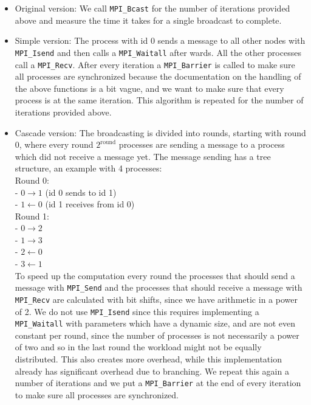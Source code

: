 \documentclass[11pt,a4paper,onecolumn]{article}
\begin{document}
\begin{itemize}
\item 
  Original version: We call \texttt{MPI\_Bcast} for the number of iterations provided above and measure the time it takes for a single broadcast to complete.
\item
  Simple version: The process with id 0 sends a message to all other nodes with \texttt{MPI\_Isend} and then calls a \texttt{MPI\_Waitall} after wards. All the other processes call a \texttt{MPI\_Recv}. After every iteration a \texttt{MPI\_Barrier} is called to make sure all processes are synchronized because the documentation on the handling of the above functions is a bit vague, and we want to make sure that every process is at the same iteration. This algorithm is repeated for the number of iterations provided above.
\item
  Cascade version: The broadcasting is divided into rounds, starting with round 0, where every round $2^{\text{round}}$ processes are sending a message to a process which did not receive a message yet. The message sending has a tree structure, an example with 4 processes:\\
  Round 0:\\
  - $0 \rightarrow 1$ (id 0 sends to id 1)\\
  - $1 \leftarrow 0$ (id 1 receives from id 0)\\
  Round 1:\\
  - $0 \rightarrow 2$\\
  - $1 \rightarrow 3$\\
  - $2 \leftarrow 0$\\
  - $3 \leftarrow 1$\\
To speed up the computation every round the processes that should send a message with \texttt{MPI\_Send} and the processes that should receive a message with \texttt{MPI\_Recv} are calculated with bit shifts, since we have arithmetic in a power of 2. We do not use \texttt{MPI\_Isend} since this requires implementing a \texttt{MPI\_Waitall} with parameters which have a dynamic size, and are not even constant per round, since the number of processes is not necessarily a power of two and so in the last round the workload might not be equally distributed. This also creates more overhead, while this implementation already has significant overhead due to branching. We repeat this again a number of iterations and we put a \texttt{MPI\_Barrier} at the end of every iteration to make sure all processes are synchronized. 
\end{itemize}
\end{document}
